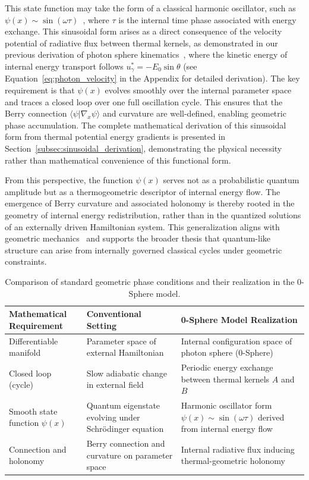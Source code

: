 \documentclass[%
 reprint,
 amsmath,amssymb,
 aps,
]{revtex4-1}
\numberwithin{equation}{section}%
\begin{document}
This state function may take the form of a classical harmonic oscillator, such as \( \psi(x) \sim \sin(\omega \tau) \)~\cite{hanamura1811.0312}, where \( \tau \) is the internal time phase associated with energy exchange. This sinusoidal form arises as a direct consequence of the velocity potential of radiative flux between thermal kernels, as demonstrated in our previous derivation of photon sphere kinematics~\cite{hanamura1811.0312}, where the kinetic energy of internal energy transport follows \( u_\gamma^* = -E_0 \sin \theta \) (see Equation~\eqref{eq:photon_velocity} in the Appendix for detailed derivation). The key requirement is that \( \psi(x) \) evolves smoothly over the internal parameter space and traces a closed loop over one full oscillation cycle. This ensures that the Berry connection \( \langle \psi | \nabla_x \psi \rangle \) and curvature are well-defined, enabling geometric phase accumulation. The complete mathematical derivation of this sinusoidal form from thermal potential energy gradients is presented in Section~\ref{subsec:sinusoidal_derivation}, demonstrating the physical necessity rather than mathematical convenience of this functional form.

From this perspective, the function $\psi(x)$ serves not as a probabilistic quantum amplitude but as a thermogeometric descriptor of internal energy flow. The emergence of Berry curvature and associated holonomy is thereby rooted in the geometry of internal energy redistribution, rather than in the quantized solutions of an externally driven Hamiltonian system. This generalization aligns with geometric mechanics~\cite{shapere1989geometric} and supports the broader thesis that quantum-like structure can arise from internally governed classical cycles under geometric constraints.


\begin{table}[t!]
\centering
\caption{Comparison of standard geometric phase conditions and their realization in the 0-Sphere model.}
\label{tab:geometry_summary}
\renewcommand{\arraystretch}{1.4}
\begin{tabular}{p{5.0cm}p{5.5cm}p{5.5cm}}
\toprule
\textbf{Mathematical Requirement} & \textbf{Conventional Setting} & \textbf{0-Sphere Model Realization} \\
\midrule
Differentiable manifold & Parameter space of external Hamiltonian & Internal configuration space of photon sphere (0-Sphere) \\
\addlinespace[0.3cm]
Closed loop (cycle) & Slow adiabatic change in external field & Periodic energy exchange between thermal kernels $A$ and $B$ \\
\addlinespace[0.3cm]
Smooth state function $\psi(x)$ & Quantum eigenstate evolving under Schrödinger equation & Harmonic oscillator form $\psi(x) \sim \sin(\omega \tau)$ derived from internal energy flow~\cite{hanamura1811.0312} \\
\addlinespace[0.3cm]
Connection and holonomy & Berry connection and curvature on parameter space & Internal radiative flux inducing thermal-geometric holonomy \\
\bottomrule
\end{tabular}
\end{table}
\end{document}
